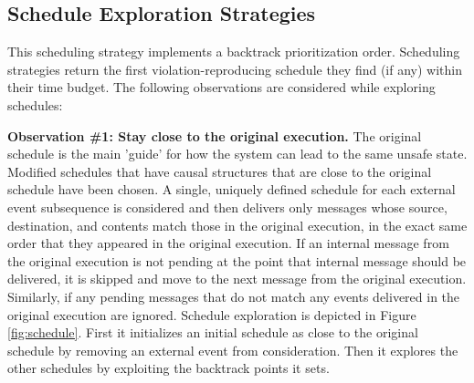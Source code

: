 \subsection{Schedule Exploration Strategies}
This scheduling strategy implements a backtrack prioritization order. Scheduling strategies return the first
violation-reproducing schedule they find (if any) within their time budget. The following observations are considered while exploring schedules:

\textbf{Observation \#1: Stay close to the original execution.}
The original schedule is the main 'guide' for how the system can lead to the same unsafe state. Modified schedules that have causal structures that are close to the original schedule have been chosen. A single, uniquely defined schedule for each external event subsequence is considered and then delivers only messages whose source,
destination, and contents match those in the original execution, in the exact same
order that they appeared in the original execution. If an internal message from the original execution is not pending at the point that internal message should be delivered, it is skipped and move to the next message from the original execution. Similarly, if any pending messages that do not match any events delivered in the original execution are ignored. Schedule exploration is depicted in Figure \ref{fig:schedule}. First it initializes an initial schedule as close to the original schedule by removing an external event from consideration. Then it explores the other schedules by exploiting the backtrack points it sets.


